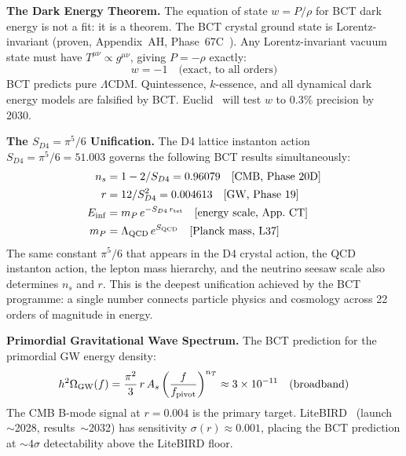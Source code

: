 \documentclass[aps,prl,twocolumn,superscriptaddress,floatfix]{revtex4-2}
\begin{document}
\medskip
\noindent\textbf{The Dark Energy Theorem.}
The equation of state $w = P/\rho$ for BCT dark energy is not a fit:
it is a theorem. The BCT crystal ground state is Lorentz-invariant
(proven, Appendix~AH, Phase~67C~\cite{Monograph}). Any Lorentz-invariant
vacuum state must have $T^{\mu\nu} \propto g^{\mu\nu}$, giving
$P = -\rho$ exactly:
\begin{equation}
  w = -1 \quad \text{(exact, to all orders)}
  \label{eq:w}
\end{equation}
BCT predicts pure $\Lambda$CDM. Quintessence, $k$-essence, and all
dynamical dark energy models are falsified by BCT.
Euclid~\cite{Euclid} will test $w$ to $0.3\%$ precision by 2030.

\medskip
\noindent\textbf{The $S_{D4} = \pi^5/6$ Unification.}
The D4 lattice instanton action $S_{D4} = \pi^5/6 = 51.003$ governs
the following BCT results simultaneously:
\begin{align}
  n_s &= 1 - 2/S_{D4} = 0.96079 \quad\text{[CMB, Phase~20D]} \label{eq:ns_SD4} \\
  r   &= 12/S_{D4}^2 = 0.004613 \quad\text{[GW, Phase~19]} \label{eq:r_SD4} \\
  E_{\rm inf} &= m_P\,e^{-S_{D4}\,r_{\rm tet}} \quad\text{[energy scale, App.~CT]} \label{eq:Einf} \\
  m_P &= \Lambda_{\rm QCD}\,e^{S_{\rm QCD}} \quad\text{[Planck mass, L37]} \label{eq:mP}
\end{align}
The same constant $\pi^5/6$ that appears in the D4 crystal action,
the QCD instanton action, the lepton mass hierarchy, and the neutrino
seesaw scale also determines $n_s$ and $r$. This is the deepest
unification achieved by the BCT programme: a single number
connects particle physics and cosmology across 22 orders of magnitude
in energy.

\medskip
\noindent\textbf{Primordial Gravitational Wave Spectrum.}
The BCT prediction for the primordial GW energy density:
\begin{equation}
  h^2\Omega_{\rm GW}(f) = \frac{\pi^2}{3}\,r\,A_s
    \left(\frac{f}{f_{\rm pivot}}\right)^{n_T}
  \approx 3\times10^{-11} \quad\text{(broadband)}
  \label{eq:GWspectrum}
\end{equation}
The CMB B-mode signal at $r = 0.004$ is the primary target.
LiteBIRD~\cite{LiteBIRD} (launch~$\sim$2028, results~$\sim$2032) has
sensitivity $\sigma(r) \approx 0.001$, placing the BCT prediction
at $\sim 4\sigma$ detectability above the LiteBIRD floor.
\end{document}
